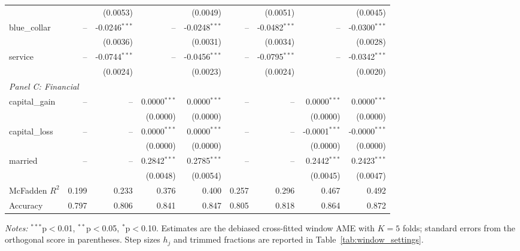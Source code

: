 \begin{table}[htbp]
\begin{threeparttable}
\begin{tabular}{lrrrrrrrr}
 &  & (0.0053) &  & (0.0049) &  & (0.0051) &  & (0.0045) \\
\quad blue\_collar & -- & -0.0246$^{***}$ & -- & -0.0248$^{***}$ & -- & -0.0482$^{***}$ & -- & -0.0300$^{***}$ \\
 &  & (0.0036) &  & (0.0031) &  & (0.0034) &  & (0.0028) \\
\quad service & -- & -0.0744$^{***}$ & -- & -0.0456$^{***}$ & -- & -0.0795$^{***}$ & -- & -0.0342$^{***}$ \\
 &  & (0.0024) &  & (0.0023) &  & (0.0024) &  & (0.0020) \\
\midrule
\multicolumn{9}{l}{\textit{Panel C: Financial}} \\
\quad capital\_gain & -- & -- & 0.0000$^{***}$ & 0.0000$^{***}$ & -- & -- & 0.0000$^{***}$ & 0.0000$^{***}$ \\
 &  &  & (0.0000) & (0.0000) &  &  & (0.0000) & (0.0000) \\
\quad capital\_loss & -- & -- & 0.0000$^{***}$ & 0.0000$^{***}$ & -- & -- & -0.0001$^{***}$ & -0.0000$^{***}$ \\
 &  &  & (0.0000) & (0.0000) &  &  & (0.0000) & (0.0000) \\
\quad married & -- & -- & 0.2842$^{***}$ & 0.2785$^{***}$ & -- & -- & 0.2442$^{***}$ & 0.2423$^{***}$ \\
 &  &  & (0.0048) & (0.0054) &  &  & (0.0045) & (0.0047) \\
\midrule
McFadden $R^2$ & 0.199 & 0.233 & 0.376 & 0.400 & 0.257 & 0.296 & 0.467 & 0.492 \\
Accuracy & 0.797 & 0.806 & 0.841 & 0.847 & 0.805 & 0.818 & 0.864 & 0.872 \\
\bottomrule
\end{tabular}
\begin{tablenotes}
\footnotesize
\item \textit{Notes:} $^{***}$p$<$0.01, $^{**}$p$<$0.05, $^{*}$p$<$0.10. Estimates are the debiased cross-fitted window AME with $K=5$ folds; standard errors from the orthogonal score in parentheses. Step sizes $h_j$ and trimmed fractions are reported in Table~\ref{tab:window_settings}.
\end{tablenotes}
\end{threeparttable}
\end{table}